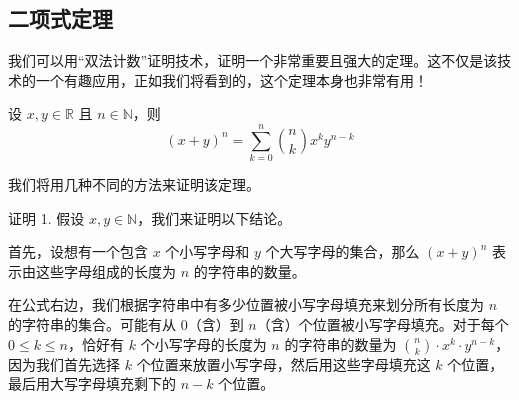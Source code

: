 
\subsection{二项式定理}\label{sec:section8.4.4}

我们可以用``双法计数''证明技术，证明一个非常重要且强大的定理。这不仅是该技术的一个有趣应用，正如我们将看到的，这个定理本身也非常有用！

\begin{theorem}\label{theorem8.4.8}
    设 $x, y \in \mathbb{R}$ 且 $n \in \mathbb{N}$，则
    \[(x+y)^n = \sum_{k=0}^{n} {n \choose k}x^ky^{n-k}\]
\end{theorem}
我们将用几种不同的方法来证明该定理。

\begin{proofs}{证明 1.}
    假设 $x, y \in \mathbb{N}$，我们来证明以下结论。

    首先，设想有一个包含 $x$ 个小写字母和 $y$ 个大写字母的集合，那么 $(x + y)^n$ 表示由这些字母组成的长度为 $n$ 的字符串的数量。

    在公式右边，我们根据字符串中有多少位置被小写字母填充来划分所有长度为 $n$ 的字符串的集合。可能有从 $0$（含）到 $n$（含）个位置被小写字母填充。对于每个 $0 \le k \le n$，恰好有 $k$ 个小写字母的长度为 $n$ 的字符串的数量为 ${n \choose k} \cdot x^k \cdot y^{n-k}$，因为我们首先选择 $k$ 个位置来放置小写字母，然后用这些字母填充这 $k$ 个位置，最后用大写字母填充剩下的 $n - k$ 个位置。
\end{proofs}

